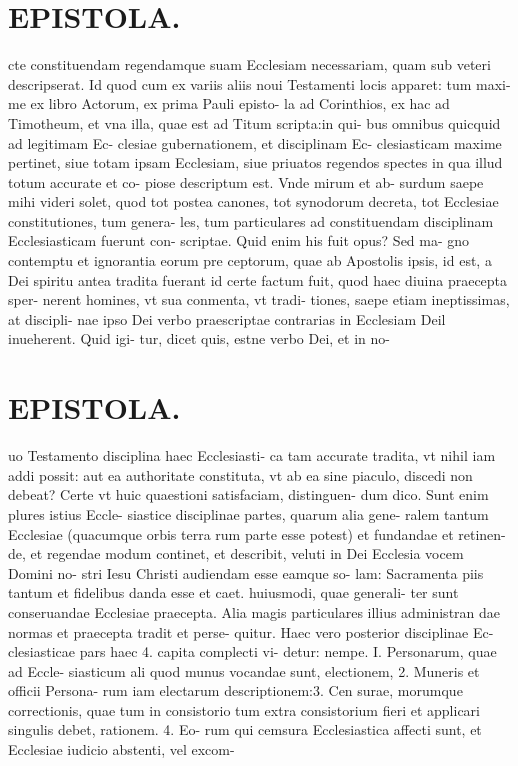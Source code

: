 \documentclass{article}
\begin{document}
\begin{pages}
\section*{EPISTOLA. }cte constituendam regendamque suam Ecclesiam necessariam, quam sub veteri descripserat. Id quod cum ex variis aliis noui Testamenti locis apparet: tum maxi- me ex libro Actorum, ex prima Pauli episto- la ad Corinthios, ex hac ad Timotheum, et vna illa, quae est ad Titum scripta:in qui- bus omnibus quicquid ad legitimam Ec- clesiae gubernationem, et disciplinam Ec- clesiasticam maxime pertinet, siue totam ipsam Ecclesiam, siue priuatos regendos spectes in qua illud totum accurate et co- piose descriptum est. Vnde mirum et ab- surdum saepe mihi videri solet, quod tot postea canones, tot synodorum decreta, tot Ecclesiae constitutiones, tum genera- les, tum particulares ad constituendam disciplinam Ecclesiasticam fuerunt con- scriptae. Quid enim his fuit opus? Sed ma- gno contemptu et ignorantia eorum pre ceptorum, quae ab Apostolis ipsis, id est, a Dei spiritu antea tradita fuerant id certe factum fuit, quod haec diuina praecepta sper- nerent homines, vt sua conmenta, vt tradi- tiones, saepe etiam ineptissimas, at discipli- nae ipso Dei verbo praescriptae contrarias in Ecclesiam Deil inueherent. Quid igi- tur, dicet quis, estne verbo Dei, et in no- 
\section*{EPISTOLA. }uo Testamento disciplina haec Ecclesiasti- ca tam accurate tradita, vt nihil iam addi possit: aut ea authoritate constituta, vt ab ea sine piaculo, discedi non debeat? Certe vt huic quaestioni satisfaciam, distinguen- dum dico. Sunt enim plures istius Eccle- siastice disciplinae partes, quarum alia gene- ralem tantum Ecclesiae (quacumque orbis terra rum parte esse potest) et fundandae et retinen- de, et regendae modum continet, et describit, veluti in Dei Ecclesia vocem Domini no- stri Iesu Christi audiendam esse eamque so- lam: Sacramenta piis tantum et fidelibus danda esse et caet. huiusmodi, quae generali- ter sunt conseruandae Ecclesiae praecepta. Alia magis particulares illius administran dae normas et praecepta tradit et perse- quitur. Haec vero posterior disciplinae Ec- clesiasticae pars haec 4. capita complecti vi- detur: nempe. I. Personarum, quae ad Eccle- siasticum ali quod munus vocandae sunt, electionem, 2. Muneris et officii Persona- rum iam electarum descriptionem:3. Cen surae, morumque correctionis, quae tum in consistorio tum extra consistorium fieri et applicari singulis debet, rationem. 4. Eo- rum qui cemsura Ecclesiastica affecti sunt, et Ecclesiae iudicio abstenti, vel excom- 

\end{pages}
\end{document}
